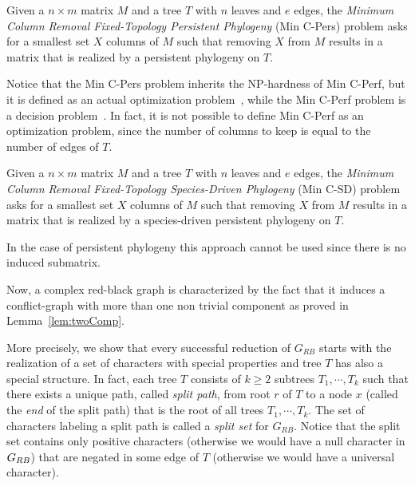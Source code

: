 \begin{definition}
\label{definition:persistent-problem}
Given a $n\times m$ matrix $M$ and a tree $T$ with $n$ leaves and $e$
edges, the
\emph{Minimum Column Removal Fixed-Topology Persistent Phylogeny} (Min
C-Pers) problem asks for a smallest set $X$ columns of $M$ such
that removing $X$ from $M$ results in a matrix that is realized by a
persistent phylogeny on $T$.
\end{definition}

Notice that the Min C-Pers problem inherits the NP-hardness of Min
C-Perf, but it is defined as an actual optimization
problem~\cite{ausiello_approximate_1995}, while the Min C-Perf problem
is a decision problem~\cite{garey_computer_1979}.
In fact, it is not possible to define  Min C-Perf as an optimization
problem, since the number of columns to keep is equal to the number of
edges of $T$.

\begin{definition}
\label{definition:species-driven-problem}
Given a $n\times m$ matrix $M$ and a tree $T$ with $n$ leaves and $e$
edges, the
\emph{Minimum Column Removal Fixed-Topology Species-Driven Phylogeny} (Min
C-SD) problem asks for a smallest set $X$ columns of $M$ such
that removing $X$ from $M$ results in a matrix that is realized by a
species-driven persistent phylogeny on $T$.
\end{definition}


In the case of persistent phylogeny this approach cannot be used since there is no induced submatrix.

Now, a complex red-black graph is characterized by the fact that it induces a
conflict-graph with more than one non trivial component as proved in
Lemma~\ref{lem:twoComp}.

More precisely,  we show that every successful
reduction of  $G_{RB}$ starts with the realization of a set of
characters with special properties and tree $T$ has also a special structure.
In fact, each tree $T$ consists of  $k \geq 2$ subtrees $T_1, \cdots, T_k$
such that there exists a unique path, called \emph{split path}, from root $r$
of $T$ to a node $x$ (called the \emph{end} of the split path)
that is  the root of all  trees $T_1, \cdots, T_k$.
The set of characters labeling a split path is called a {\em split set} for
$G_{RB}$.
Notice that the split set contains only positive characters (otherwise we would
have a null
character in $G_{RB}$) that are negated in some edge of $T$ (otherwise we would
have a universal character).

